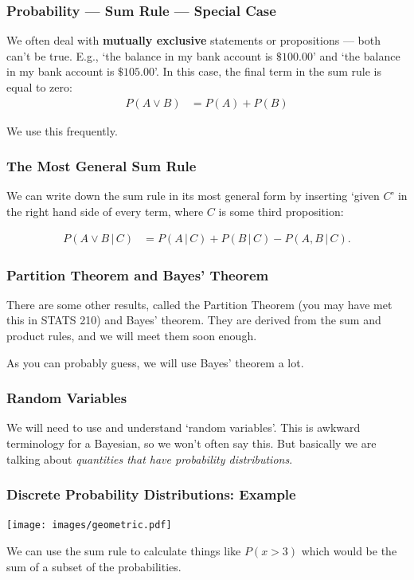 \documentclass{beamer}
\newcommand{\given}{\,|\,}
\begin{document}
\begin{frame}
\frametitle{Probability --- Sum Rule --- Special Case}
We often deal with {\bf mutually exclusive} statements or propositions ---
both can't be true. E.g., `the balance in my bank account is $\$100.00$'
and `the balance in my bank account is $\$105.00$'.
In this case, the final term in the sum rule is equal to zero:
\begin{align}
P(A \vee B) &= P(A) + P(B)
\end{align}\pause

We use this frequently.


\end{frame}


\begin{frame}
\frametitle{The Most General Sum Rule}
We can write down the sum rule in its most general form by inserting
`given $C$' in the right hand side of every term, where $C$ is some third
proposition:

\begin{align}
P(A \vee B \given C) &= P(A \given C) + P(B \given C) - P(A, B \given C).
\end{align}

\end{frame}

\begin{frame}
\frametitle{Partition Theorem and Bayes' Theorem}
There are some other results, called the Partition Theorem
(you may have met this
in STATS 210) and Bayes' theorem. They are derived from the sum and product
rules, and we will meet them soon enough.\\[0.5em]\pause

As you can probably guess, we will use Bayes' theorem a lot.

\end{frame}



\begin{frame}
\frametitle{Random Variables}
We will need to use and understand `random variables'. This is awkward
terminology for a Bayesian, so we won't often say this. But basically
we are talking about {\em quantities that have probability distributions}.

\end{frame}


\begin{frame}
\frametitle{Discrete Probability Distributions: Example}

\begin{center}
\texttt{[image: images/geometric.pdf]}
\end{center}

We can use the sum rule to calculate things like $P(x > 3)$ which would be
the sum of a subset of the probabilities.

\end{frame}
\end{document}
